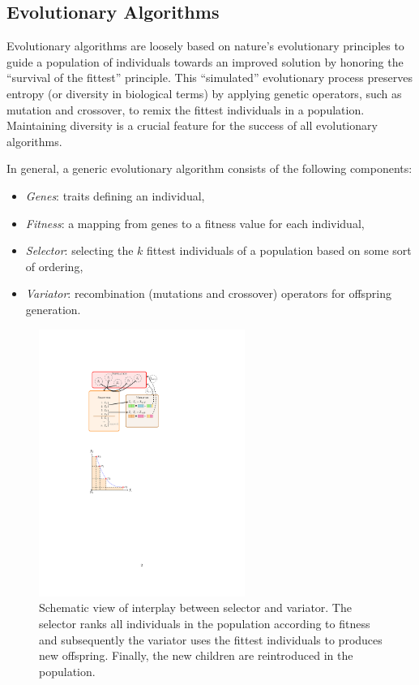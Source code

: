 \documentclass[preprint,linenumbers,amsmath,amssymb,aps,prstab]{revtex4-1}%
\begin{document}
\subsection{Evolutionary Algorithms}

Evolutionary algorithms are loosely based on nature's evolutionary
  principles to guide a population of individuals towards an improved solution
  by honoring the ``survival of the fittest'' principle.
This ``simulated'' evolutionary process preserves entropy (or diversity in
  biological terms) by applying genetic operators, such as mutation and
  crossover, to remix the fittest individuals in a population.
Maintaining diversity is a crucial feature for the success of all evolutionary
  algorithms.

In general, a generic evolutionary algorithm consists of the following
  components:
%
\begin{itemize}
  \item \textit{Genes}: traits defining an individual,
  \item \textit{Fitness}: a mapping from genes to a fitness value for each
    individual,
  \item \textit{Selector}: selecting the $k$ fittest individuals of a
    population based on some sort of ordering,
  \item \textit{Variator}: recombination (mutations and crossover) operators
    for offspring generation.
\end{itemize}

\begin{figure}
    \centering
    \includegraphics[width=0.6\textwidth]{figures/ga_explained_big}
  \caption{Schematic view of interplay between selector and variator. The
  selector ranks all individuals in the population according to fitness and
  subsequently the variator uses the fittest individuals to produces new
  offspring. Finally, the new children are reintroduced in the population.}
  \label{fig:varsel}
\end{figure}
\end{document}
